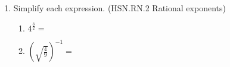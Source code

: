 \documentclass[12pt, twoside]{article}
\begin{document}
\begin{enumerate}
\item Simplify each expression. \hfill (HSN.RN.2 Rational exponents)
    \begin{multicols}{2}
    \begin{enumerate}[itemsep=0.5cm]
        \item $\displaystyle 4^{\frac{3}{2}} =$
        \item $\left( \sqrt{\frac{4}{9}} \right)^{-1} =$
    \end{enumerate}
    \end{multicols}


\end{enumerate}
\end{document}
